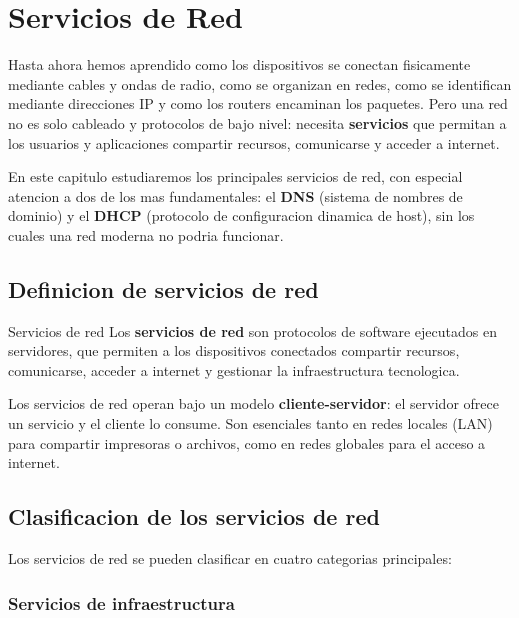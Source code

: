 
\chapter{Servicios de Red}

Hasta ahora hemos aprendido como los dispositivos se conectan fisicamente
mediante cables y ondas de radio, como se organizan en redes, como se
identifican mediante direcciones IP y como los routers encaminan los paquetes.
Pero una red no es solo cableado y protocolos de bajo nivel: necesita
\textbf{servicios} que permitan a los usuarios y aplicaciones compartir recursos,
comunicarse y acceder a internet.

En este capitulo estudiaremos los principales servicios de red, con especial
atencion a dos de los mas fundamentales: el \textbf{DNS} (sistema de nombres de
dominio) y el \textbf{DHCP} (protocolo de configuracion dinamica de host), sin
los cuales una red moderna no podria funcionar.


\section{Definicion de servicios de red}

\begin{definicion}{Servicios de red}
Los \textbf{servicios de red} son protocolos de software ejecutados en servidores,
que permiten a los dispositivos conectados compartir recursos, comunicarse,
acceder a internet y gestionar la infraestructura tecnologica.
\end{definicion}

Los servicios de red operan bajo un modelo \textbf{cliente-servidor}: el servidor
ofrece un servicio y el cliente lo consume. Son esenciales tanto en redes
locales (LAN) para compartir impresoras o archivos, como en redes globales
para el acceso a internet.


\section{Clasificacion de los servicios de red}

Los servicios de red se pueden clasificar en cuatro categorias principales:

\subsection{Servicios de infraestructura}


